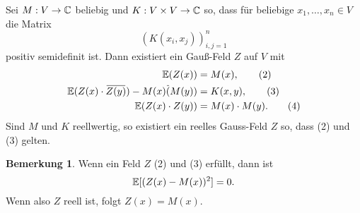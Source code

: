\documentclass[
 a4paper,
 12pt,
 parskip=half
 ]{scrreprt}
\theoremstyle{plain}
\theoremstyle{definition}
\newtheorem*{rmrk*}{Bemerkung}
\numberwithin{equation}{section}
\begin{document}
\clearpage

\begin{thm}
  Sei $M : V \to \mathbb{C}$ beliebig und $K : V \times V \to \mathbb{C}$ so, dass
  für beliebige $x_1, \ldots, x_n \in V$ die Matrix
  \[ (K(x_i, x_j) )_{i,j=1}^n \tag{1} \]
  positiv semidefinit ist. Dann existiert ein Gauß-Feld $Z$ auf $V$ mit
  \begin{align*}
    \pE(Z(x))
    &= M(x), \tag{2} \\
    \pE(Z(x) \cdot \obar{Z(y)}) - M(x) \obar(M(y))
    &= K(x,y), \tag{3} \\
    \pE(Z(x) \cdot Z(y))
    &= M(x) \cdot M(y). \tag{4}
  \end{align*}
  Sind $M$ und $K$ reellwertig, so existiert ein reelles Gauss-Feld $Z$ so, dass
  (2) und (3) gelten.
\end{thm}

\begin{rmrk*}
  Wenn ein Feld $Z$ (2) und (3) erfüllt, dann ist
  \[ \mathbb{E}[ (Z(x) - M(x))^2 ] = 0. \]
  Wenn also $Z$ reell ist, folgt $Z(x) = M(x)$.
\end{rmrk*}

\appendix






\end{document}
